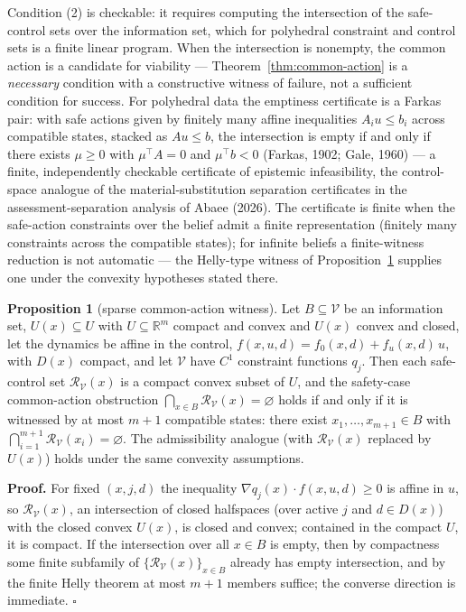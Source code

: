 \documentclass[10pt,twocolumn]{article}
\theoremstyle{definition}
\newtheorem{proposition}{Proposition}
\begin{document}
Condition (2) is checkable: it requires computing the intersection of
the safe-control sets over the information set, which for polyhedral
constraint and control sets is a finite linear program. When the
intersection is nonempty, the common action is a candidate for viability
--- Theorem~\ref{thm:common-action} is a \emph{necessary} condition with a constructive
witness of failure, not a sufficient condition for success. For
polyhedral data the emptiness certificate is a Farkas pair: with safe
actions given by finitely many affine inequalities \(A_i u \le b_i\)
across compatible states, stacked as \(A u \le b\), the intersection is
empty if and only if there exists \(\mu \ge 0\) with \(\mu^{\top} A = 0\) and \(\mu^{\top} b < 0\) (Farkas, 1902;
Gale, 1960) --- a finite, independently checkable certificate of
epistemic infeasibility, the control-space analogue of the material-substitution separation certificates in the assessment-separation analysis of Abaee (2026). The certificate
is finite when the safe-action constraints over the belief admit a finite
representation (finitely many constraints across the compatible states);
for infinite beliefs a finite-witness reduction is not automatic --- the
Helly-type witness of Proposition~\ref{prop:helly} supplies one under the
convexity hypotheses stated there.

\begin{proposition}[sparse common-action witness]\label{prop:helly}
Let \(B\subseteq\mathcal V\) be an information set, \(U(x)\subseteq U\)
with \(U\subseteq\mathbb R^m\) compact and convex and \(U(x)\) convex and
closed, let the dynamics be affine in the control,
\(f(x,u,d)=f_0(x,d)+f_u(x,d)\,u\), with \(D(x)\) compact, and let
\(\mathcal V\) have \(C^1\) constraint functions \(q_j\). Then each
safe-control set \(\mathcal R_{\mathcal V}(x)\) is a compact convex
subset of \(U\), and the safety-case common-action obstruction
\(\bigcap_{x\in B}\mathcal R_{\mathcal V}(x)=\varnothing\) holds if and
only if it is witnessed by at most \(m+1\) compatible states: there
exist \(x_1,\dots,x_{m+1}\in B\) with
\(\bigcap_{i=1}^{m+1}\mathcal R_{\mathcal V}(x_i)=\varnothing\). The
admissibility analogue (with \(\mathcal R_{\mathcal V}(x)\) replaced by
\(U(x)\)) holds under the same convexity assumptions.
\end{proposition}

\textbf{Proof.} For fixed \((x,j,d)\) the inequality
\(\nabla q_j(x)\cdot f(x,u,d)\ge 0\) is affine in \(u\), so
\(\mathcal R_{\mathcal V}(x)\), an intersection of closed halfspaces
(over active \(j\) and \(d\in D(x)\)) with the closed convex \(U(x)\),
is closed and convex; contained in the compact \(U\), it is compact. If
the intersection over all \(x\in B\) is empty, then by compactness some
finite subfamily of \(\{\mathcal R_{\mathcal V}(x)\}_{x\in B}\) already
has empty intersection, and by the finite Helly theorem at most \(m+1\)
members suffice; the converse direction is immediate. \hfill\(\square\)
\end{document}
